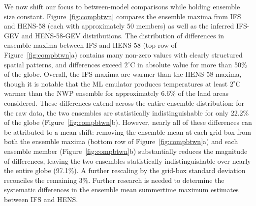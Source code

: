 \documentclass[draft]{agujournal2019}
\begin{document}


We now shift our focus to between-model comparisons while holding ensemble size constant. Figure~\ref{fig:compbtwn} compares the ensemble maxima from IFS and HENS-58 (each with approximately 50 members) as well as the inferred IFS-GEV and HENS-58-GEV distributions. The distribution of differences in ensemble maxima between IFS and HENS-58 (top row of Figure~\ref{fig:compbtwn}a) contains many non-zero values with clearly structured spatial patterns, and differences exceed $2^\circ$C in absolute value for more than 50\% of the globe. Overall, the IFS maxima are warmer than the HENS-58 maxima, though it is notable that the ML emulator produces temperatures at least $2^\circ$C warmer than the NWP ensemble for approximately 6.6\% of the land areas considered. These differences extend across the entire ensemble distribution: for the raw data, the two ensembles are statistically indistinguishable for only 22.2\% of the globe (Figure~\ref{fig:compbtwn}b). However, nearly all of these differences can be attributed to a mean shift: removing the ensemble mean at each grid box from both the ensemble maxima (bottom row of Figure~\ref{fig:compbtwn}a) and each ensemble member (Figure~\ref{fig:compbtwn}b) substantially reduces the magnitude of differences, leaving the two ensembles statistically indistinguishable over nearly the entire globe (97.1\%). A further rescaling by the grid-box standard deviation reconciles the remaining 3\%.  Further research is needed to determine the systematic differences in the ensemble mean summertime maximum estimates between IFS and HENS.

\end{document}
